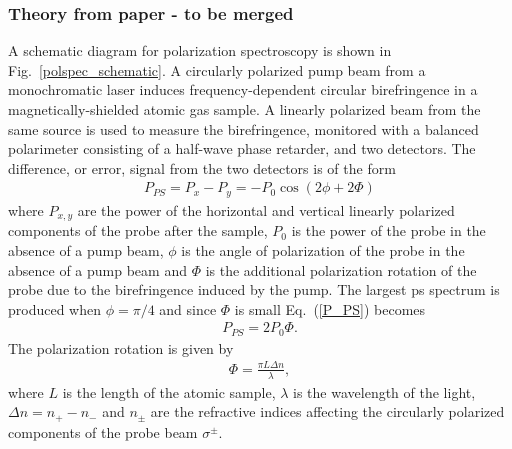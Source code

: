 \subsubsection{Theory from paper - to be merged}
A schematic diagram for polarization spectroscopy is shown in Fig.~\ref{polspec_schematic}. A circularly polarized pump beam from a monochromatic laser induces frequency-dependent circular birefringence in a magnetically-shielded atomic gas sample. A linearly polarized beam from the same source is used to measure the birefringence, monitored with a balanced polarimeter consisting of a half-wave phase retarder,  and two detectors. The difference, or error, signal from the two detectors is of the form \cite{pearman_polarization_2002}
\begin{align}
P_{PS} = P_x-P_y = -P_0 \cos(2\phi+2\Phi)\label{P_PS}
\end{align}
where $P_{x,y}$ are the power of the horizontal and vertical linearly polarized components of the probe after the sample, $P_0$ is the power of the probe in the absence of a pump beam, $\phi$ is the angle of polarization of the probe in the absence of a pump beam and $\Phi$ is the additional polarization rotation of the probe due to the birefringence induced by the pump. The largest \gls*{ps} spectrum is produced when $\phi=\pi/4$ and since $\Phi$ is small Eq.~(\ref{P_PS})  becomes
\begin{align}
P_{PS} = 2P_0 \Phi.
\end{align}
The polarization rotation is given by
\begin{align}
\Phi = \frac{\pi L \Delta n}{\lambda},
\end{align}
where $L$ is the length of the atomic sample, $\lambda$ is the wavelength of the light, $\Delta n = n_+ - n_-$ and $n_\pm$ are the refractive indices affecting the circularly polarized components of the probe beam $\sigma^\pm$.
